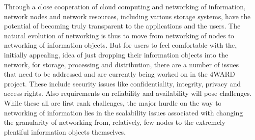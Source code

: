 Through a close cooperation of cloud computing and
networking of information, network nodes and network
resources, including various storage systems, have the
potential of becoming truly transparent to the applications
and the users. The natural evolution of networking is thus to
move from networking of nodes to networking of
information objects. But for users to feel comfortable with
the, initially appealing, idea of just dropping their
information objects into the network, for storage, processing
and distribution, there are a number of issues that need to be
addressed and are currently being worked on in the 4WARD
project. These include security issues like confidentiality,
integrity, privacy and access rights. Also requirements on
reliability and availability will pose challenges. While these
all are first rank challenges, the major hurdle
on the way to networking of information lies in the
scalability issues associated with changing the granularity of
networking from, relatively, few nodes to the extremely
plentiful information objects themselves. 





